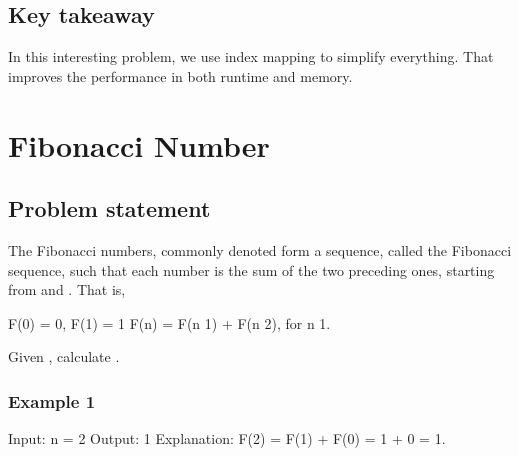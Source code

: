 \documentclass[letterpaper,12pt,english]{book}
\begin{document}
\subsection{Key takeaway}
\label{\detokenize{Dynamic_Programming/05_DP_368_Largest_Divisible_Subset:key-takeaway}}
\sphinxAtStartPar
In this interesting problem, we use index mapping to simplify everything. That improves the performance in both runtime and memory.

\sphinxstepscope


\section{Fibonacci Number}
\label{\detokenize{Dynamic_Programming/05_DP_509_Fibonacci_Number:fibonacci-number}}\label{\detokenize{Dynamic_Programming/05_DP_509_Fibonacci_Number::doc}}

\subsection{Problem statement\sphinxfootnotemark[97]}
\label{\detokenize{Dynamic_Programming/05_DP_509_Fibonacci_Number:problem-statement}}%
\begin{footnotetext}[97]\sphinxAtStartFootnote
{}
%
\end{footnotetext}\ignorespaces 
\sphinxAtStartPar
The Fibonacci numbers, commonly denoted  form a sequence, called the Fibonacci sequence, such that each number is the sum of the two preceding ones, starting from  and . That is,

\begin{sphinxVerbatim}[commandchars=\\\{\}]
F(0) = 0, F(1) = 1
F(n) = F(n \PYGZhy{} 1) + F(n \PYGZhy{} 2), for n \PYGZgt{} 1.
\end{sphinxVerbatim}

\sphinxAtStartPar
Given , calculate .


\subsubsection{Example 1}
\label{\detokenize{Dynamic_Programming/05_DP_509_Fibonacci_Number:example-1}}
\begin{sphinxVerbatim}[commandchars=\\\{\}]
Input: n = 2
Output: 1
Explanation: F(2) = F(1) + F(0) = 1 + 0 = 1.
\end{sphinxVerbatim}
\end{document}

